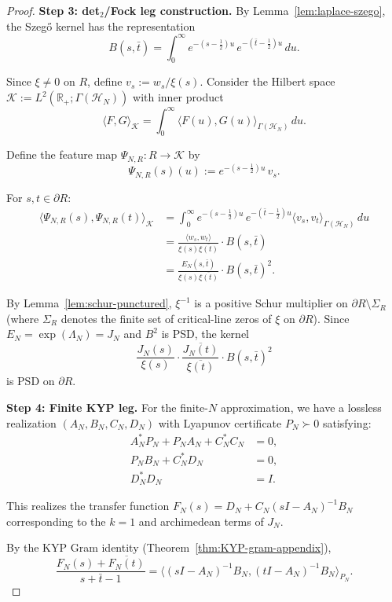 \documentclass[11pt]{article}
\theoremstyle{remark}
\begin{document}
\begin{proof}
\medskip
\noindent\textbf{Step 3: det$_2$/Fock leg construction.}
By Lemma~\ref{lem:laplace-szego}, the Szegő kernel has the representation
\[
  B(s,\bar t) = \int_0^\infty e^{-(s-\frac{1}{2})u} \, e^{-(\bar t - \frac{1}{2})u} \, du.
\]

Since $\xi \neq 0$ on $R$, define $v_s := w_s / \xi(s)$. Consider the Hilbert space $\mathcal{K} := L^2(\mathbb{R}_+; \Gamma(\mathcal{H}_N))$ with inner product
\[
  \langle F, G \rangle_{\mathcal{K}} = \int_0^\infty \langle F(u), G(u) \rangle_{\Gamma(\mathcal{H}_N)} \, du.
\]

Define the feature map $\Psi_{N,R}: R \to \mathcal{K}$ by
\[
  \Psi_{N,R}(s)(u) := e^{-(s-\frac{1}{2})u} \, v_s.
\]

For $s,t \in \partial R$:
\begin{align}
  \langle \Psi_{N,R}(s), \Psi_{N,R}(t) \rangle_{\mathcal{K}} 
  &= \int_0^\infty e^{-(s-\frac{1}{2})u} \, e^{-(\bar t - \frac{1}{2})u} \langle v_s, v_t \rangle_{\Gamma(\mathcal{H}_N)} \, du\\
  &= \frac{\langle w_s, w_t \rangle}{\xi(s)\overline{\xi(t)}} \cdot B(s,\bar t)\\
  &= \frac{E_N(s,\bar t)}{\xi(s)\overline{\xi(t)}} \cdot B(s,\bar t)^2.
\end{align}

By Lemma~\ref{lem:schur-punctured}, \(\xi^{-1}\) is a positive Schur multiplier on \(\partial R \setminus \Sigma_R\) (where \(\Sigma_R\) denotes the finite set of critical-line zeros of \(\xi\) on \(\partial R\)). Since \(E_N = \exp(\Lambda_N) = J_N\) and \(B^2\) is PSD, the kernel
\[
  \frac{J_N(s)}{\xi(s)} \cdot \frac{\overline{J_N(t)}}{\overline{\xi(t)}} \cdot B(s,\bar t)^2
\]
is PSD on \(\partial R\).

\medskip
\noindent\textbf{Step 4: Finite KYP leg.}
For the finite-$N$ approximation, we have a lossless realization $(A_N, B_N, C_N, D_N)$ with Lyapunov certificate $P_N \succ 0$ satisfying:
\begin{align}
  A_N^* P_N + P_N A_N + C_N^* C_N &= 0,\\
  P_N B_N + C_N^* D_N &= 0,\\
  D_N^* D_N &= I.
\end{align}

This realizes the transfer function $F_N(s) = D_N + C_N(sI - A_N)^{-1}B_N$ corresponding to the $k=1$ and archimedean terms of $J_N$.

By the KYP Gram identity (Theorem~\ref{thm:KYP-gram-appendix}),
\[
  \frac{F_N(s) + \overline{F_N(t)}}{s + \bar t - 1} = \langle (sI - A_N)^{-1}B_N, (tI - A_N)^{-1}B_N \rangle_{P_N}.
\]


\end{proof}
\end{document}
